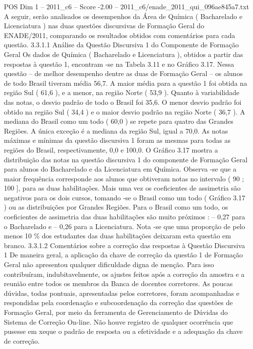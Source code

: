 \begin{textsample}{POS Dim 1 – 2011\_c6 – Score -2.00 – 2011\_c6/enade\_2011\_qui\_096ae845a7.txt}
A seguir, serão analisados os desempenhos da Área de Química ( Bacharelado e Licenciatura ) nas duas questões discursivas de Formação Geral do ENADE/2011, comparando os resultados obtidos com comentários para cada questão. 3.3.1.1 Análise da Questão Discursiva 1 do Componente de Formação Geral Os dados de Química ( Bacharelado e Licenciatura ), obtidos a partir das respostas à questão 1, encontram -se na Tabela 3.11 e no Gráfico 3.17.
Nessa questão – de melhor desempenho dentre as duas de Formação Geral – os alunos de todo Brasil tiveram média 56,7.
A maior média para a questão 1 foi obtida na região Sul ( 61,6 ), e a menor, na região Norte ( 53,9 ).
Quanto à variabilidade das notas, o desvio padrão de todo o Brasil foi 35,6.
O menor desvio padrão foi obtido na região Sul ( 34,4 ) e o maior desvio padrão na região Norte ( 36,7 ).
A mediana do Brasil como um todo ( 60,0 ) se repete para quatro das Grandes Regiões.
A única exceção é a mediana da região Sul, igual a 70,0.
As notas máximas e mínimas da questão discursiva 1 foram as mesmas para todas as regiões do Brasil, respectivamente, 0,0 e 100,0.
O Gráfico 3.17 mostra a distribuição das notas na questão discursiva 1 do componente de Formação Geral para alunos do Bacharelado e da Licenciatura em Química.
Observa -se que a maior frequência corresponde aos alunos que obtiveram notas no intervalo ( 90 ; 100 ], para as duas habilitações.
Mais uma vez os coeficientes de assimetria são negativos para os dois cursos, tomando -se o Brasil como um todo ( Gráfico 3.17 ) ou as distribuições por Grandes Regiões.
Para o Brasil como um todo, os coeficientes de assimetria das duas habilitações são muito próximos : – 0,27 para o Bacharelado e – 0,26 para a Licenciatura.
Nota -se que uma proporção de pelo menos 10 \% dos estudantes das duas habilitações deixaram esta questão em branco. 3.3.1.2 Comentários sobre a correção das respostas à Questão Discursiva 1 De maneira geral, a aplicação da chave de correção da questão 1 de Formação Geral não apresentou qualquer dificuldade digna de menção.
Para isso contribuíram, indubitavelmente, os ajustes feitos após a correção da amostra e a reunião entre todos os membros da Banca de docentes corretores.
As poucas dúvidas, todas pontuais, apresentadas pelos corretores, foram acompanhadas e respondidas pela coordenação e subcoordenação da correção das questões de Formação Geral, por meio da ferramenta de Gerenciamento de Dúvidas do Sistema de Correção On-line.
Não houve registro de qualquer ocorrência que pusesse em xeque o padrão de resposta ou a efetividade e a adequação da chave de correção.

\end{textsample}
